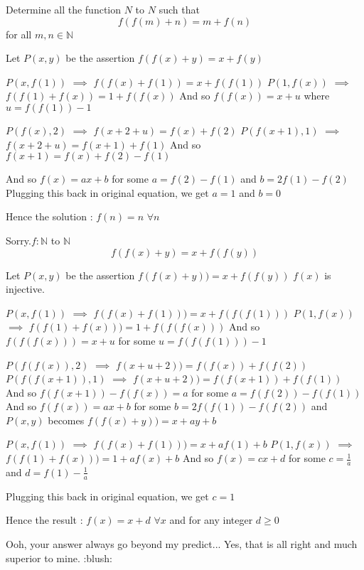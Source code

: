 \begin{solution}
	\begin{tcolorbox}Determine all the function $N$ to $N$ such that
\[f(f(m)+n)=m+f(n)\]
for all $m,n\in\mathbb{N}$\end{tcolorbox}
Let $P(x,y)$ be the assertion $f(f(x)+y)=x+f(y)$

$P(x,f(1))$ $\implies$ $f(f(x)+f(1))=x+f(f(1))$
$P(1,f(x))$ $\implies$ $f(f(1)+f(x))=1+f(f(x))$
And so $f(f(x))=x+u$ where $u=f(f(1))-1$

$P(f(x),2)$ $\implies$ $f(x+2+u)=f(x)+f(2)$
$P(f(x+1),1)$ $\implies$ $f(x+2+u)=f(x+1)+f(1)$
And so $f(x+1)=f(x)+f(2)-f(1)$

And so $f(x)=ax+b$ for some $a=f(2)-f(1)$ and $b=2f(1)-f(2)$
Plugging this back in original equation, we get $a=1$ and $b=0$

Hence the solution : $\boxed{f(n)=n}$ $\forall n$
\end{solution}



\begin{solution}
	\begin{tcolorbox}Sorry.$f:\mathbb{N}$ to $\mathbb{N}$
\[f(f(x)+y)=x+f(f(y))\]\end{tcolorbox}
Let $P(x,y)$ be the assertion $f(f(x)+y))=x+f(f(y))$
$f(x)$ is injective.

$P(x,f(1))$ $\implies$ $f(f(x)+f(1)))=x+f(f(f(1)))$
$P(1,f(x))$ $\implies$ $f(f(1)+f(x)))=1+f(f(f(x)))$
And so $f(f(f(x)))=x+u$ for some $u=f(f(f(1)))-1$

$P(f(f(x)),2)$ $\implies$ $f(x+u+2))=f(f(x))+f(f(2))$
$P(f(f(x+1)),1)$ $\implies$ $f(x+u+2))=f(f(x+1))+f(f(1))$
And so $f(f(x+1))-f(f(x))=a$ for some $a=f(f(2))-f(f(1))$
And so $f(f(x))=ax+b$ for some $b=2f(f(1))-f(f(2))$ and $P(x,y)$ becomes $f(f(x)+y))=x+ay+b$

$P(x,f(1))$ $\implies$ $f(f(x)+f(1)))=x+af(1)+b$
$P(1,f(x))$ $\implies$ $f(f(1)+f(x)))=1+af(x)+b$
And so $f(x)=cx+d$ for some $c=\frac 1a$ and $d=f(1)-\frac 1a$

Plugging this back in original equation, we get $c=1$

Hence the result : $\boxed{f(x)=x+d}$ $\forall x$ and for any integer $d\ge 0$
\end{solution}



\begin{solution}
	Ooh, your answer always go beyond my predict...
Yes, that is all right and much superior to mine. :blush:
\end{solution}



